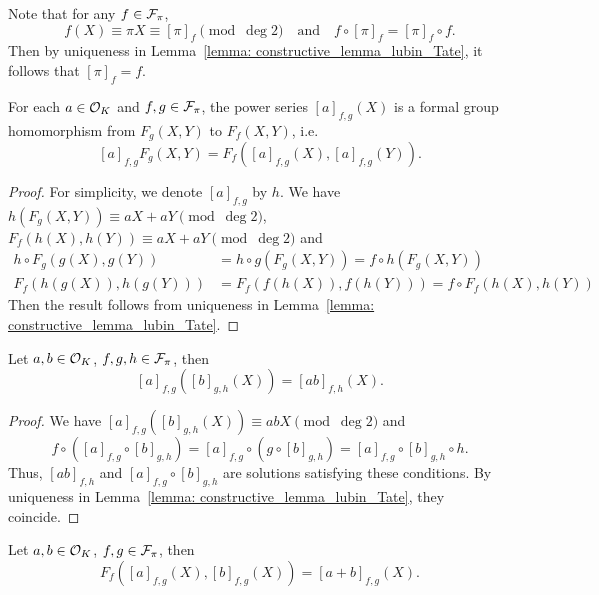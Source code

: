 \begin{remark}
    Note that for any $f\in \mathcal{F}_\pi$,
    \[f(X) \equiv \pi X \equiv [\pi]_f \pmod{\deg 2} \quad  \text{and} \quad
    f \circ [\pi]_f = [\pi]_f \circ f. \]
    Then by uniqueness in Lemma~\ref{lemma: constructive_lemma_lubin_Tate},
    it follows that $[\pi]_f = f$.
\end{remark}

\begin{theorem}
    For each $a \in \mathcal{O}_K$ and $f, g \in \mathcal{F}_\pi$, the power series $[a]_{f,g}(X)$ is a
    formal group homomorphism from $F_g(X,Y)$ to $F_f(X,Y)$, i.e.
    \[[a]_{f,g} F_g(X,Y) = F_f([a]_{f,g}(X), [a]_{f,g} (Y)).\]
\end{theorem}

\begin{proof}
    For simplicity, we denote $[a]_{f,g}$ by $h$. We have $h(F_g(X,Y)) \equiv aX+aY
    \pmod{\deg 2}$, $F_f(h(X), h(Y)) \equiv aX+ aY \pmod{\deg 2}$ and
    \begin{align*}
        h\circ F_g(g(X),g(Y)) &= h\circ g(F_g(X,Y)) = f \circ h (F_g(X,Y)) \\
        F_f(h(g(X)), h(g(Y))) &= F_f(f(h(X)), f(h(Y))) = f \circ F_f(h(X), h(Y))
    \end{align*}
    Then the result follows from uniqueness in Lemma~\ref{lemma: constructive_lemma_lubin_Tate}.
    \end{proof}

\begin{theorem}
    Let $a, b \in \mathcal{O}_K$, $f, g, h \in \mathcal{F}_\pi$, then
    \[[a]_{f,g} ([b]_{g,h}(X)) = [ab]_{f,h} (X).\]
\end{theorem}

\begin{proof}
    We have $[a]_{f,g} ([b]_{g,h}(X)) \equiv abX \pmod{\deg 2}$ and
    \begin{equation*}
        f \circ ([a]_{f, g} \circ [b]_{g,h}) = [a]_{f,g} \circ (g \circ [b]_{g,h})
        = [a]_{f,g}\circ [b]_{g,h} \circ h.
    \end{equation*}
    Thus, $[ab]_{f,h}$ and $[a]_{f,g} \circ [b]_{g,h}$ are solutions satisfying these conditions.
    By uniqueness in Lemma~\ref{lemma: constructive_lemma_lubin_Tate}, they coincide.
\end{proof}

\begin{theorem}
    Let $a, b \in \mathcal{O}_K$, $f, g \in \mathcal{F}_\pi$, then
    \[F_f([a]_{f,g}(X), [b]_{f,g}(X)) = [a+b]_{f,g} (X).\]
\end{theorem}


